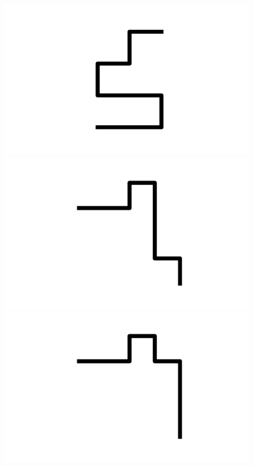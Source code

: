\documentclass[]{report}
\begin{document}
\includegraphics[scale=.1]{pictures/21/state_cluster_shapes_256.pdf} 
\includegraphics[scale=.1]{pictures/21/state_cluster_shapes_257.pdf} 
\includegraphics[scale=.1]{pictures/21/state_cluster_shapes_258.pdf} 
\end{document}
